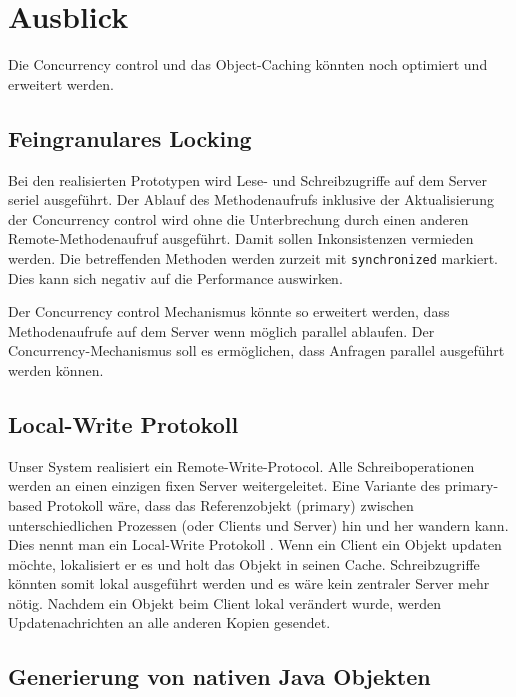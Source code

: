\chapter{Ausblick}

Die Concurrency control und das Object-Caching könnten noch optimiert und erweitert werden.


\section{Feingranulares Locking}
\label{sec:feingr-lock}

Bei den realisierten Prototypen wird Lese- und Schreibzugriffe auf dem Server seriel ausgeführt. Der Ablauf des Methodenaufrufs inklusive der Aktualisierung der Concurrency control wird ohne die Unterbrechung durch einen anderen Remote-Methodenaufruf ausgeführt. Damit sollen Inkonsistenzen vermieden werden. Die betreffenden Methoden werden zurzeit mit \texttt{synchronized} markiert. Dies kann sich negativ auf die Performance auswirken. 

Der Concurrency control Mechanismus könnte so erweitert werden, dass Methodenaufrufe auf dem Server wenn möglich parallel ablaufen. 
Der Concurrency-Mechanismus soll es ermöglichen, dass Anfragen parallel ausgeführt werden können.

\section{Local-Write Protokoll}
\label{sec:local-write-prot}

Unser System realisiert ein Remote-Write-Protocol. Alle Schreiboperationen werden an einen einzigen fixen Server weitergeleitet.
Eine Variante des primary-based Protokoll wäre, dass das Referenzobjekt (primary) zwischen unterschiedlichen Prozessen (oder Clients und Server) hin und her wandern kann. Dies nennt man ein Local-Write Protokoll \cite{tanenbaum07}. Wenn ein Client ein Objekt updaten möchte, lokalisiert er es und holt das Objekt in seinen Cache. Schreibzugriffe könnten somit lokal ausgeführt werden und es wäre kein zentraler Server mehr nötig. Nachdem ein Objekt beim Client lokal verändert wurde, werden Updatenachrichten an alle anderen Kopien gesendet.

\section{Generierung von nativen Java Objekten}
\label{sec:gener-von-nativ}


